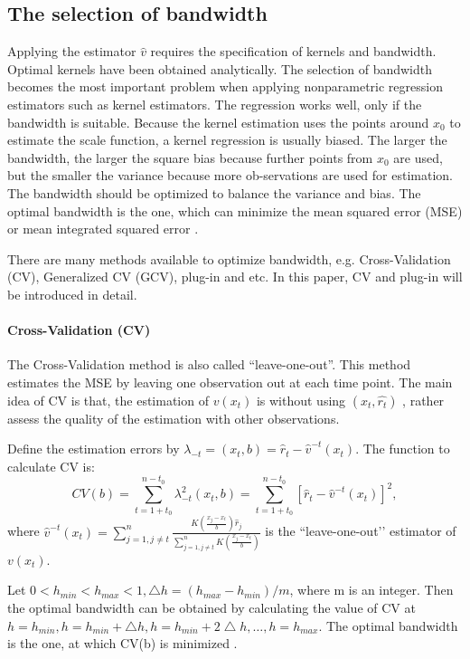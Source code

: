 \subsection{The selection of bandwidth}
Applying the estimator $\hat{v}$  requires the specification of kernels and bandwidth. Optimal kernels have been obtained analytically. The selection of bandwidth becomes the most important problem when applying nonparametric regression estimators such as kernel estimators. The regression works well, only if the bandwidth is suitable. Because the kernel estimation uses the points around $x_{0}$  to estimate the scale function, a kernel regression is usually biased. The larger the bandwidth, the larger the square bias because further points from $x_{0}$ are used, but the smaller the variance because more ob-servations are used for estimation. The bandwidth should be optimized to balance the variance and bias. The optimal bandwidth is the one, which can minimize the mean squared error (MSE) or mean integrated squared error \cite{Gasser1991}. 

There are many methods available to optimize bandwidth, e.g. Cross-Validation (CV), Generalized CV (GCV), plug-in and etc. In this paper, CV and plug-in will be introduced in detail.

\paragraph{Cross-Validation (CV)}

The Cross-Validation method is also called “leave-one-out”.  This method estimates the MSE by leaving one observation out at each time point. The main idea of CV is that, the estimation of $v(x_{t})$ is without using $(x_{t},\hat{r_{t}})$  , rather assess the quality of the estimation with other observations. 

Define the estimation errors by $\lambda_{-t}=(x_{t},b)=\hat{r}_{t}-\hat{v}^{-t}(x_{t})$. The function to calculate CV is:
\begin{equation}
CV(b) = \sum_{t=1+t_{0}}^{n-t_{0}}\lambda_{-t}^{2}(x_{t},b)=\sum_{t=1+t_{0}}^{n-t_{0}}[\hat{r}_{t}-\hat{v}^{-t}(x_{t})]^{2},
\end{equation}
where $\hat{v}^{-t}(x_t)=\sum_{j=1,j\neq t}^{n}\frac{K(\frac{x_{j}-x_{t}}{b})\hat{r}_{j}}{\sum_{j=1,j \neq t}^{n}K(\frac{x_{j}-x_{t}}{b})}$ is the “leave-one-out’’ estimator of $v(x_{t})$.

Let $0<h_{min}<h_{max}<1, \bigtriangleup h=(h_{max}-h_{min})/m$, where m is an integer. Then the optimal bandwidth can be obtained by calculating the value of CV at $h=h_{min}, h=h_{min} + \bigtriangleup h, h=h_{min} + 2\bigtriangleup h, \ldots, h=h_{max}$. The optimal bandwidth is the one, at which CV(b) is minimized \cite{Sarda1993}.

